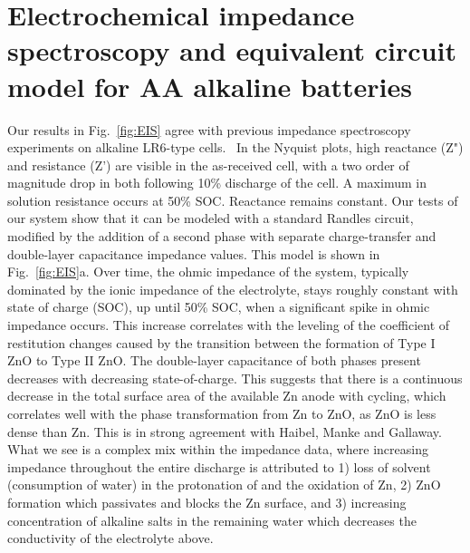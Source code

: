\chapter{Electrochemical impedance spectroscopy and equivalent circuit model for AA alkaline batteries\label{ch:eis}}

Our results in Fig.~\ref{fig:EIS} agree with previous impedance spectroscopy experiments on alkaline LR6-type cells.~\cite{wang,root} In the Nyquist plots, high reactance (Z") and resistance (Z') are visible in the as-received cell, with a two order of magnitude drop in both following 10\% discharge of the cell. A maximum in solution resistance occurs at 50\% SOC. Reactance remains constant. Our tests of our system show that it can be modeled with a standard Randles circuit, modified by the addition of a second phase with separate charge-transfer and double-layer capacitance impedance values. This model is shown in Fig.~\ref{fig:EIS}a. Over time, the ohmic impedance of the system, typically dominated by the ionic impedance of the electrolyte, stays roughly constant with state of charge (SOC), up until 50\% SOC, when a significant spike in ohmic impedance occurs. This increase correlates with the leveling of the coefficient of restitution changes caused by the transition between the formation of Type I ZnO to Type II ZnO. The double-layer capacitance of both phases present decreases with decreasing state-of-charge. This suggests that there is a continuous decrease in the total surface area of the available Zn anode with cycling, which correlates well with the phase transformation from Zn to ZnO, as ZnO is less dense than Zn. This is in strong agreement with Haibel, Manke and Gallaway.~\cite{haibel,manke,gallaway}  What we see is a complex mix within the impedance data, where increasing impedance throughout the entire discharge is attributed to 1) loss of solvent (consumption of water) in the protonation of  and the oxidation of Zn, 2) ZnO formation which passivates and blocks the Zn surface, and 3) increasing concentration of alkaline salts in the remaining water which decreases the conductivity of the electrolyte above.~\cite{linden}

